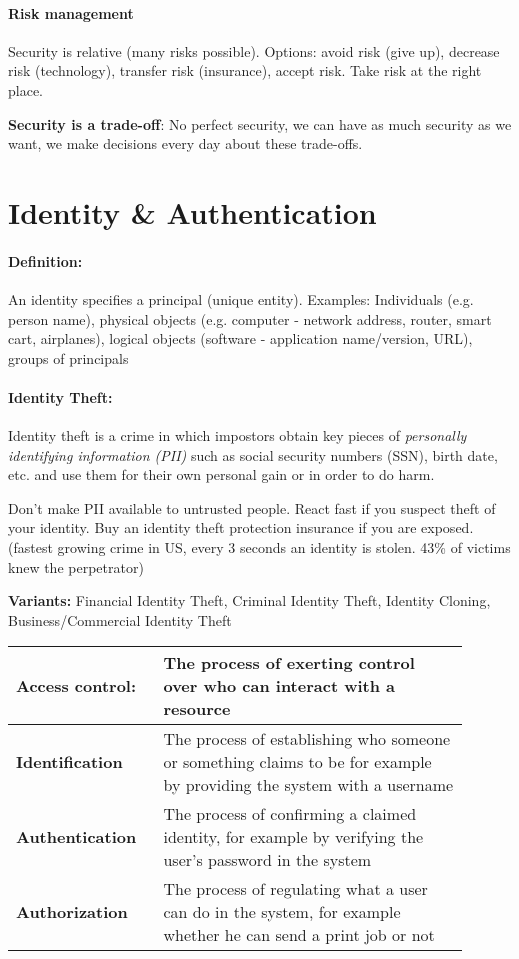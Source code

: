 \paragraph{Risk management}
Security is relative (many risks possible). Options: avoid risk (give up), decrease risk
(technology), transfer risk (insurance),
accept risk. Take risk at the right place.

\textbf{Security is a trade-off}: No perfect security, we can have as much security as we want, we make decisions
every day about these trade-offs.

\section{Identity \& Authentication}
\paragraph{Definition:} An identity specifies a principal (unique entity). Examples: Individuals (e.g. person name), physical objects (e.g.
computer - network address, router, smart cart, airplanes), logical
objects (software - application name/version, URL), groups of
principals

\paragraph{Identity Theft:} Identity theft is a crime in which impostors obtain key
pieces of \emph{personally identifying information (PII)} such as social
security numbers (SSN), birth date, etc. and use them for their own
personal gain or in order to do harm.

 Don't make PII available to untrusted
people. React fast if you suspect theft of your identity. Buy an identity
theft protection insurance if you are exposed. (fastest growing crime
in US, every 3 seconds an identity is stolen. 43\% of victims knew the
perpetrator)

\textbf{Variants:} Financial Identity Theft, Criminal Identity Theft, Identity
Cloning, Business/Commercial Identity Theft

\begin{tabular}{p{0.28\linewidth}p{0.62\linewidth}}
\textbf{Access control:} & The process of exerting control over who can interact with a resource \\
\hline
\hline
\textbf{Identification} & The process of establishing who someone or something claims to be for example by providing the system with a username \\
\hline
\textbf{Authentication} & The process of confirming a claimed identity, for example by verifying the user's password in the system \\
\hline
\textbf{Authorization} & The process of regulating what a user can do in the system, for example whether he can send a print job or not \\
\end{tabular}

